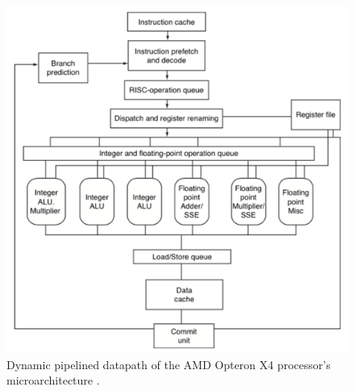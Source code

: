 

\begin{figure}[h]
\centering 
\includegraphics[width=6in]{./pics/amd-opteron-x4-uarch}
\caption{Dynamic pipelined datapath of the AMD Opteron X4 processor's microarchitecture \cite{Patterson2012}.}
\label{fig:amdopteronx4uarch}
\end{figure}

